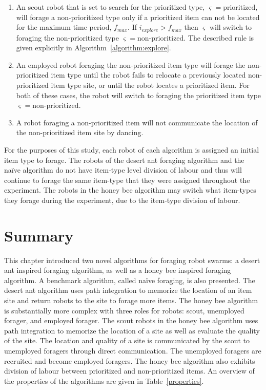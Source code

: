 \begin{enumerate}
\item An scout robot that is set to search for the prioritized type, $\varsigma=\text{prioritized}$, will forage a non-prioritized type only if a prioritized item can not be located for the maximum time period, $f_{max}$. If $i_{explore} > f_{max}$ then $\varsigma$ will switch to foraging the non-prioritized type $\varsigma=\text{non-prioritized}$. The described rule is given explicitly in Algorithm~\ref{algorithm:explore}.
\item An employed robot foraging the non-prioritized item type will forage the non-prioritized item type until the robot fails to relocate a previously located non-prioritized item type site, or until the robot locates a prioritized item. For both of these cases, the robot will switch to foraging the prioritized item type $\varsigma=\text{non-prioritized}$.
\item A robot foraging a non-prioritized item will not communicate the location of the non-prioritized item site by dancing. 
\end{enumerate}

For the purposes of this study, each robot of each algorithm is assigned an initial item type to forage. The robots of the desert ant foraging algorithm and the na\"ive algorithm do not have item-type level division of labour and thus will continue to forage the same item-type that they were assigned throughout the experiment. The robots in the honey bee algorithm may switch what item-types they forage during the experiment, due to the item-type division of labour. 

\section{Summary}
\label{prioritized:summary}

This chapter introduced two novel algorithms for foraging robot swarms: a desert ant inspired foraging algorithm, as well as a honey bee inspired foraging algorithm. A benchmark algorithm, called na\"ive foraging, is also presented. The desert ant algorithm uses path integration to memorize the location of an item site and return robots to the site to forage more items. The honey bee algorithm is substantially more complex with three roles for robots: scout, unemployed forager, and employed forager. The scout robots in the honey bee algorithm uses path integration to memorize the location of a site as well as evaluate the quality of the site. The location and quality of a site is communicated by the scout to unemployed foragers through direct communication. The unemployed foragers are recruited and become employed foragers. The honey bee algorithm also exhibits division of labour between prioritized and non-prioritized items. An overview of the properties of the algorithms are given in Table~\ref{properties}.

